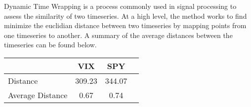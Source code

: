 \documentclass{article}
\begin{document}
Dynamic Time Wrapping is a process commonly used in signal processing to assess the similarity of two timeseries. At a high level, the method works to find minimize the euclidian distance between two timeseries by mapping points from one timeseries to another. A summary of the average distances between the timeseries can be found below.

\begin{table}[h]
    \centering
\begin{tabular}{l||ccc}
    \toprule
     & \textbf{VIX} & \textbf{SPY} & \\
    \midrule
    Distance & 309.23 & 344.07 \\
    Average Distance & 0.67 & 0.74\\
    \bottomrule
\end{tabular}
\end{table}
\end{document}
